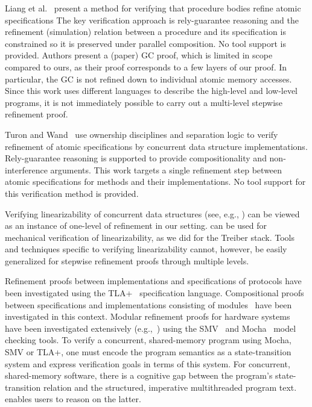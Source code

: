 Liang et al.~\cite{LiangRGSim} present a method for verifying that procedure
bodies refine atomic specifications
The key verification approach is
rely-guarantee reasoning and the refinement (simulation) relation between
a procedure and its specification is constrained so it is preserved under
parallel composition. 
No tool support is provided. 
Authors present a (paper) GC proof, which is limited in scope compared
to ours, as their proof corresponds to a few layers of our proof. In particular,
the GC is not refined down to individual atomic memory accesses. 
Since this work uses different languages to describe the high-level
and low-level programs, it is not immediately possible to carry out a
multi-level stepwise refinement proof. 

Turon and Wand~\cite{TuronM11} use ownership disciplines and
separation logic to verify refinement of atomic specifications by 
concurrent data structure implementations. 
Rely-guarantee reasoning is
supported to provide compositionality and non-interference
arguments. 
This work targets a single refinement step between atomic
specifications for methods and their implementations. 
No tool support for this verification method is provided. 

Verifying linearizability of concurrent data structures (see, e.g.,
\cite{tacasLin,aliLin}) can be viewed as an instance of one-level of
refinement in our setting. 
\civl can be used for mechanical
verification of linearizability, as we did for the Treiber stack. 
Tools and techniques specific to verifying linearizability
cannot, however, be easily generalized for stepwise refinement proofs
through multiple levels. 

Refinement proofs
between implementations and specifications of protocols have been
investigated using the TLA+~\cite{Lamport2004} specification
language. 
Compositional proofs between specifications and
implementations consisting of modules~\cite{AbadiAssumeGuarantee} have
been investigated in this context. 
Modular refinement proofs for hardware systems have been investigated extensively
(e.g.,~\cite{Henzinger1999,Eiriksson2000}) using the SMV~\cite{McMillan00} and Mocha~\cite{AlurHMQRT98} 
model checking tools.
To verify a concurrent, shared-memory program using Mocha, SMV or
TLA+, one must encode
the program semantics as a state-transition system and express
verification goals in terms of this system. 
For concurrent, shared-memory
software, there is a cognitive gap between the program's state-transition relation
and the structured, imperative multithreaded program text.
\civl enables users to reason on the latter.
 

